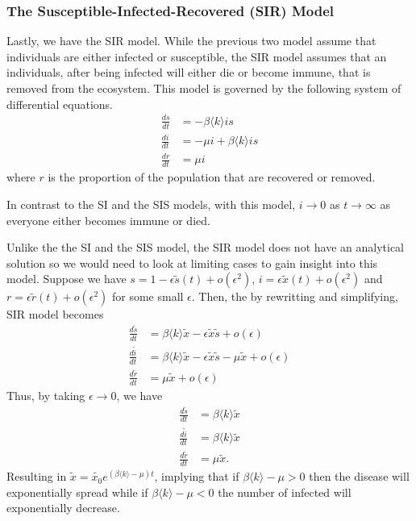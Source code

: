\documentclass[
]{article}
\theoremstyle{definition}
\theoremstyle{definition}
\begin{document}
\hypertarget{the-susceptible-infected-recovered-sir-model}{%
\subsubsection{The Susceptible-Infected-Recovered (SIR)
Model}\label{the-susceptible-infected-recovered-sir-model}}

Lastly, we have the SIR model. While the previous two model assume that
individuals are either infected or susceptible, the SIR model assumes
that an individuals, after being infected will either die or become
immune, that is removed from the ecosystem. This model is governed by
the following system of differential equations. \begin{align*}
  \frac{ds}{dt} & = -\beta \langle k \rangle is\\
  \frac{di}{dt} & = - \mu i + \beta \langle k \rangle is\\
  \frac{dr}{dt} & = \mu i
\end{align*} where \(r\) is the proportion of the population that are
recovered or removed.

In contrast to the SI and the SIS models, with this model, \(i \to 0\)
as \(t \to \infty\) as everyone either becomes immune or died.

Unlike the the SI and the SIS model, the SIR model does not have an
analytical solution so we would need to look at limiting cases to gain
insight into this model. Suppose we have
\(s = 1 - \epsilon \tilde{s}(t) + o(\epsilon^2)\),
\(i = \epsilon \tilde{x}(t) + o(\epsilon^2)\) and
\(r = \epsilon \tilde{r}(t) + o(\epsilon^2)\) for some small
\(\epsilon\). Then, the by rewritting and simplifying, SIR model becomes
\begin{align*}
  \frac{d\tilde{s}}{dt} & = \beta \langle k \rangle \tilde{x} - 
    \epsilon \tilde{x} \tilde{s} + o(\epsilon)\\
  \frac{d\tilde{i}}{dt} & = \beta \langle k \rangle \tilde{x} - 
    \epsilon \tilde{x} \tilde{s} - \mu \tilde{x} + o(\epsilon)\\
  \frac{d\tilde{r}}{dt} & = \mu \tilde{x} + o(\epsilon)
\end{align*} Thus, by taking \(\epsilon \to 0\), we have \begin{align*}
  \frac{d\tilde{s}}{dt} & = \beta \langle k \rangle \tilde{x}\\
  \frac{d\tilde{i}}{dt} & = \beta \langle k \rangle \tilde{x}\\
  \frac{d\tilde{r}}{dt} & = \mu \tilde{x}.
\end{align*} Resulting in
\(\tilde{x} = \tilde{x_0}e^{(\beta \langle k \rangle - \mu)t}\),
implying that if \(\beta \langle k \rangle - \mu > 0\) then the disease
will exponentially spread while if \(\beta \langle k \rangle - \mu < 0\)
the number of infected will exponentially decrease.
\end{document}
